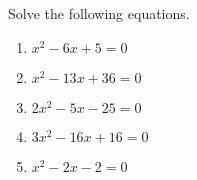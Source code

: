 \documentclass{article}
\begin{document}
\HomeworkTitle[class={College Algebra}, number={2}, name={Quadratic Equations}]

Solve the following equations.

\begin{enumerate}
\item $x^2 - 6x + 5 = 0$

   \vspace{4cm}

\item $x^2 - 13x + 36 = 0$

   \vspace{4cm}

\item $2x^2 - 5x - 25 = 0$

   \vspace{4cm}

\item $3x^2 - 16x + 16 = 0$

   \vspace{4cm}

\item 

$x^2 - 2x - 2 = 0$

  
\end{enumerate}
\end{document}
